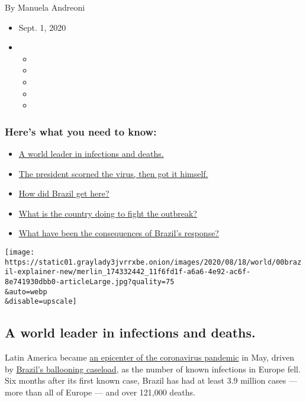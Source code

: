 By Manuela Andreoni

\begin{itemize}
\item
  Sept. 1, 2020
\item
  \begin{itemize}
  \item
  \item
  \item
  \item
  \item
  \end{itemize}
\end{itemize}

\hypertarget{heres-what-you-need-to-know}{%
\subsubsection{Here's what you need to
know:}\label{heres-what-you-need-to-know}}

\begin{itemize}
\tightlist
\item
  \protect\hyperlink{link-6cf7a36a}{A world leader in infections and
  deaths.}
\item
  \protect\hyperlink{link-7aa8053f}{The president scorned the virus,
  then got it himself.}
\item
  \protect\hyperlink{link-1c5e3f23}{How did Brazil get here?}
\item
  \protect\hyperlink{link-6a723006}{What is the country doing to fight
  the outbreak?}
\item
  \protect\hyperlink{link-41ddb021}{What have been the consequences of
  Brazil's response?}
\end{itemize}

\texttt{[image: https://static01.graylady3jvrrxbe.onion/images/2020/08/18/world/00brazil-explainer-new/merlin\_174332442\_11f6fd1f-a6a6-4e92-ac6f-8e741930dbb0-articleLarge.jpg?quality=75\\\&auto=webp\\\&disable=upscale]}

\hypertarget{a-world-leader-in-infections-and-deaths}{%
\subsection{A world leader in infections and
deaths.}\label{a-world-leader-in-infections-and-deaths}}

Latin America became
\href{https://www.nytimes3xbfgragh.onion/2020/05/12/world/americas/latin-america-virus-death.html}{an
epicenter of the coronavirus pandemic} in May, driven by
\href{https://www.nytimes3xbfgragh.onion/interactive/2020/world/americas/brazil-coronavirus-cases.html}{Brazil's
ballooning caseload}, as the number of known infections in Europe fell.
Six months after its first known case, Brazil has had at least 3.9
million cases --- more than all of Europe --- and over 121,000 deaths.


